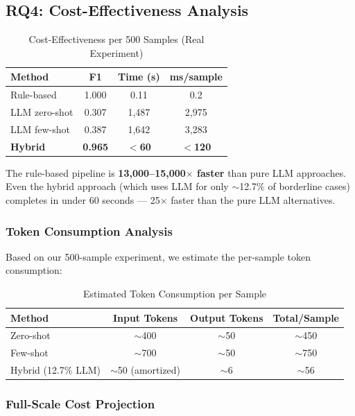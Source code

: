 \documentclass[acmlarge,nonacm,screen]{acmart}
\begin{document}
\subsection{RQ4: Cost-Effectiveness Analysis}

\begin{table}[htbp]
\caption{Cost-Effectiveness per 500 Samples (Real Experiment)}
\label{tab:rq4}
\begin{tabular}{@{}lccc@{}}
\toprule
\textbf{Method} & \textbf{F1} & \textbf{Time (s)} & \textbf{ms/sample} \\
\midrule
Rule-based & 1.000 & 0.11 & 0.2 \\
LLM zero-shot & 0.307 & 1,487 & 2,975 \\
LLM few-shot & 0.387 & 1,642 & 3,283 \\
\textbf{Hybrid} & \textbf{0.965} & \textbf{$<$60} & \textbf{$<$120} \\
\bottomrule
\end{tabular}
\end{table}

The rule-based pipeline is \textbf{13,000--15,000$\times$ faster} than pure LLM approaches. Even the hybrid approach (which uses LLM for only $\sim$12.7\% of borderline cases) completes in under 60 seconds --- 25$\times$ faster than the pure LLM alternatives.

\subsubsection{Token Consumption Analysis}

Based on our 500-sample experiment, we estimate the per-sample token consumption:

\begin{table}[htbp]
\caption{Estimated Token Consumption per Sample}
\label{tab:token-analysis}
\begin{tabular}{@{}lccc@{}}
\toprule
\textbf{Method} & \textbf{Input Tokens} & \textbf{Output Tokens} & \textbf{Total/Sample} \\
\midrule
Zero-shot & $\sim$400 & $\sim$50 & $\sim$450 \\
Few-shot & $\sim$700 & $\sim$50 & $\sim$750 \\
Hybrid (12.7\% LLM) & $\sim$50 (amortized) & $\sim$6 & $\sim$56 \\
\bottomrule
\end{tabular}
\end{table}

\subsubsection{Full-Scale Cost Projection}
\end{document}
